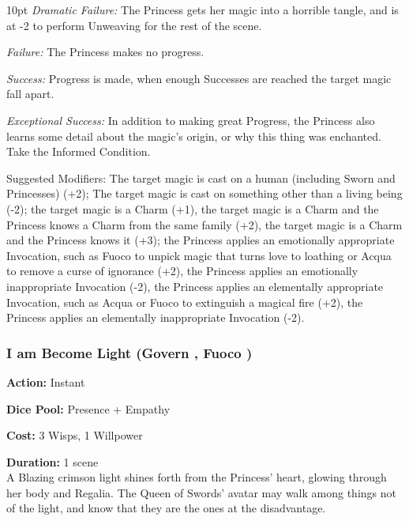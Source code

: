 \begin{myindentpar}{10pt}    \emph{Dramatic Failure:} The Princess gets her magic into a horrible tangle, and is at -2 to perform Unweaving for the rest of the scene.

    \emph{Failure:} The Princess makes no progress.
    
    \emph{Success:} Progress is made, when enough Successes are reached the target magic fall apart.
    
    \emph{Exceptional Success:} In addition to making great Progress, the Princess also learns some detail about the magic's origin, or why this thing was enchanted. Take the Informed Condition.
    
    Suggested Modifiers: The target magic is cast on a human (including Sworn and Princesses) (+2); The target magic is cast on something other than a living being (-2); the target magic is a Charm (+1), the target magic is a Charm and the Princess knows a Charm from the same family (+2), the target magic is a Charm and the Princess knows it (+3); the Princess applies an emotionally appropriate Invocation, such as Fuoco to unpick magic that turns love to loathing or Acqua to remove a curse of ignorance (+2), the Princess applies an emotionally inappropriate Invocation (-2), the Princess applies an elementally appropriate Invocation, such as Acqua or Fuoco to extinguish a magical fire (+2), the Princess applies an elementally inappropriate Invocation (-2).\end{myindentpar}

\subsubsection*{I am Become Light (Govern \textbullet\textbullet\textbullet\textbullet\textbullet, Fuoco \textbullet\textbullet\textbullet\textbullet)}

\noindent \textbf{Action:} Instant 

\noindent \textbf{Dice Pool:} Presence + Empathy

\noindent \textbf{Cost:} 3 Wisps, 1 Willpower

\noindent \textbf{Duration:} 1 scene \\

\noindent A Blazing crimson light shines forth from the Princess' heart, glowing through her body and Regalia. The Queen of Swords' avatar may walk among things not of the light, and know that they are the ones at the disadvantage.

